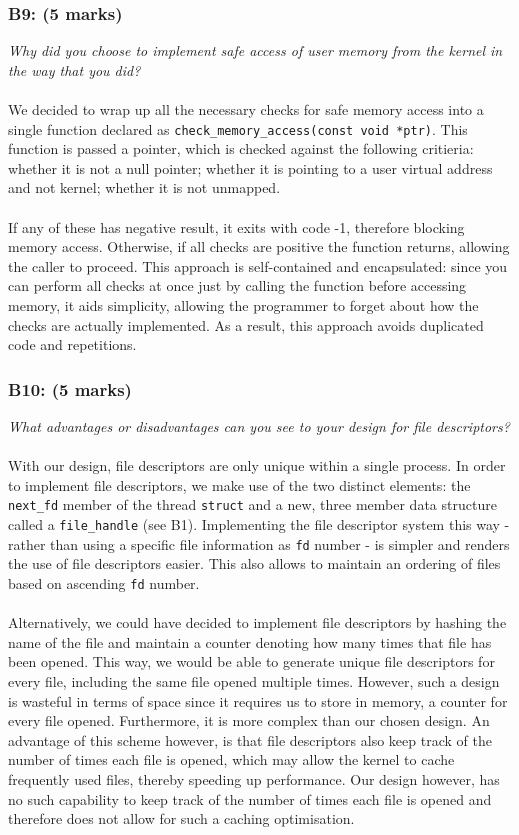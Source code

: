 \documentclass{article}
\begin{document}
\subsubsection*{B9: (5 marks) }
\textit{Why did you choose to implement safe access of user memory from the
kernel in the way that you did?}
\\ \\
We decided to wrap up all the necessary checks for safe memory access into a single function declared as \texttt{check\_memory\_access(const void *ptr)}. This function is passed a pointer, which is checked against the following critieria: whether it is not a null pointer; whether it is pointing to a user virtual address and not kernel; whether it is not unmapped.
\\ \\
If any of these has negative result, it exits with code -1, therefore blocking memory access.
Otherwise, if all checks are positive the function returns, allowing the caller to proceed.
This approach is self-contained and encapsulated: since you can perform all checks at once just by calling the function before accessing memory, it aids simplicity, allowing the programmer to forget about how the checks are actually implemented. As a result, this approach avoids duplicated code and repetitions.

\subsubsection*{B10: (5 marks) }
\textit{What advantages or disadvantages can you see to your design for file
descriptors?}
\\ \\
With our design, file descriptors are only unique within a single process. In order to implement file descriptors, we make use of the two distinct elements: the \texttt{next\_fd} member of the thread \texttt{struct} and a new, three member data structure called a \texttt{file\_handle} (see B1).
Implementing the file descriptor system this way - rather than using a specific file information as \texttt{fd} number - is simpler and renders the use of file descriptors easier. This also allows to maintain an ordering of files based on ascending \texttt{fd} number.
\\ \\
Alternatively, we could have decided to implement file descriptors by hashing the name of the file and maintain a counter denoting how many times that file has been opened. This way, we would be able to generate unique file descriptors for every file, including the same file opened multiple times. However, such a design is wasteful in terms of space since it requires us to store in memory, a counter for every file opened. Furthermore, it is more complex than our chosen design. An advantage of this scheme however, is that file descriptors also keep track of the number of times each file is opened, which may allow the kernel to cache frequently used files, thereby speeding up performance. Our design however, has no such capability to keep track of the number of times each file is opened and therefore does not allow for such a caching optimisation.
\end{document}
